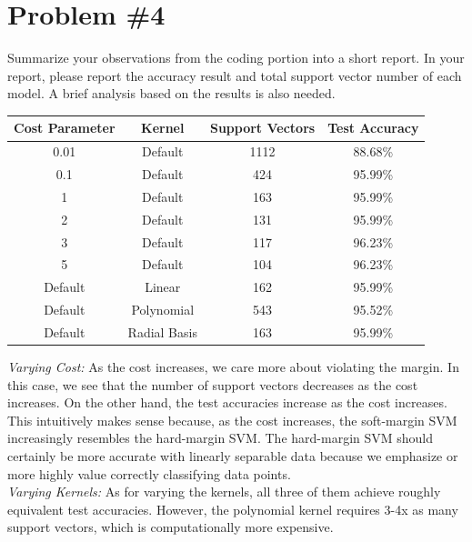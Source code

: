 \documentclass[12pt]{article}
\begin{document}
	\section*{Problem \#4}
	Summarize your observations from the coding portion into a short report. In your report, please report the accuracy result and total support vector number of each model. A brief analysis based on the results is also needed. \\
	\begin{center}
		\begin{tabular*}{340pt}[t]{c c | c c }
			Cost Parameter & Kernel &  Support Vectors & Test Accuracy\\
			\hline \hline
			0.01 & Default & 1112 & 88.68\% \\
			0.1 & Default & 424 & 95.99\% \\
			1 & Default & 163 & 95.99\% \\
			2 & Default & 131 & 95.99\% \\
			3 & Default & 117 & 96.23\% \\
			5 & Default & 104 & 96.23\% \\
			Default & Linear & 162 & 95.99\% \\
			Default & Polynomial & 543 & 95.52\% \\
			Default & Radial Basis & 163 & 95.99\% \\
		\end{tabular*}
	\end{center}
	\textit{Varying Cost:}
	As the cost increases, we care more about violating the margin. In this case, we see that the number of support vectors decreases as the cost increases. On the other hand, the test accuracies increase as the cost increases. This intuitively makes sense because, as the cost increases, the soft-margin SVM increasingly resembles the hard-margin SVM. The hard-margin SVM should certainly be more accurate with linearly separable data because we emphasize or more highly value correctly classifying data points. \\
	\textit{Varying Kernels:}
	As for varying the kernels, all three of them achieve roughly equivalent test accuracies. However, the polynomial kernel requires 3-4x as many support vectors, which is computationally more expensive.
	
	
	
\end{document}

